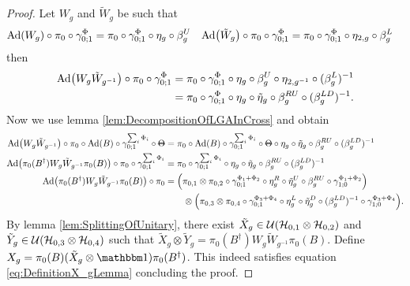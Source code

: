 \documentclass[11pt,a4paper,twoside]{article}
\numberwithin{equation}{section}
\begin{document}
	\begin{proof}
		Let $W_g$ and $\tilde W_g$ be such that
		\begin{align}
			\Ad{W_g}\circ\pi_0\circ\gamma^\Phi_{0;1}& =\pi_0\circ\gamma^\Phi_{0;1}\circ\eta_g\circ\beta_g^U
			&\Ad{\tilde W_g} \circ\pi_0\circ\gamma^\Phi_{0;1}& =\pi_0\circ\gamma^\Phi_{0;1}\circ\eta_{2,g}\circ\beta_g^L
		\end{align}
		then
		\begin{align}
			\Ad{W_g\tilde{W}_{g^{-1}}}\circ\pi_0\circ\gamma^\Phi_{0;1}&=\pi_0\circ\gamma^\Phi_{0;1}\circ\eta_g\circ\beta_g^U\circ\eta_{2,g^{-1}}\circ(\beta_g^L)^{-1}\\
			&=\pi_0\circ\gamma^\Phi_{0;1}\circ\eta_g\circ\tilde{\eta}_g\circ\beta_g^{RU}\circ(\beta_g^{LD})^{-1}.
		\end{align}
		Now we use lemma \ref{lem:DecompositionOfLGAInCross} and obtain
		\begin{align}
			\Ad{W_g\tilde{W}_{g^{-1}}}\circ\pi_0\circ\Ad{B}\circ\gamma^{\sum_i\Phi_i}_{0;1}\circ\stkout{\Theta}&=\pi_0\circ\Ad{B}\circ\gamma^{\sum_i\Phi_i}_{0;1}\circ\stkout{\Theta}\circ\eta_g\circ\tilde{\eta}_g\circ\beta_g^{RU}\circ(\beta_g^{LD})^{-1}\\
			\Ad{\pi_0(B^\dagger)W_g\tilde{W}_{g^{-1}}\pi_0(B)}\circ\pi_0\circ\gamma^{\sum_i\Phi_i}_{0;1}&=\pi_0\circ\gamma^{\sum_i\Phi_i}_{0;1}\circ\eta_g\circ\tilde{\eta}_g\circ\beta_g^{RU}\circ(\beta_g^{LD})^{-1}\\
			\Ad{\pi_0(B^\dagger)W_g\tilde{W}_{g^{-1}}\pi_0(B)}\circ\pi_0&=\left(\pi_{0,1}\otimes\pi_{0,2}\circ\gamma^{\Phi_1+\Phi_2}_{0;1}\circ\eta_g^R\circ\tilde{\eta}_g^U\circ\beta_g^{RU}\circ\gamma^{\Phi_1+\Phi_2}_{1;0}\right)\\
			\nonumber
			&\qquad\otimes \left(\pi_{0,3}\otimes\pi_{0,4}\circ\gamma^{\Phi_3+\Phi_4}_{0;1}\circ\eta_g^L\circ\tilde{\eta}_g^D\circ(\beta_g^{LD})^{-1}\circ\gamma^{\Phi_3+\Phi_4}_{1;0}\right).
		\end{align}
		By lemma \ref{lem:SplittingOfUnitary}, there exist $\tilde{X}_g\in\mathcal U(\mathcal H_{0,1}\otimes\mathcal H_{0,2})$ and $\tilde{Y}_g\in\mathcal U(\mathcal H_{0,3}\otimes\mathcal H_{0,4})$ such that $\tilde{X}_g\otimes\tilde{Y}_g=\pi_0(B^\dagger)W_g\tilde{W}_{g^{-1}}\pi_0(B)$. Define $X_g=\pi_0(B)(\tilde{X}_g\otimes\id)\pi_0(B^\dagger)$. This indeed satisfies equation \eqref{eq:DefinitionX_gLemma} concluding the proof.
	\end{proof}
\end{document}
